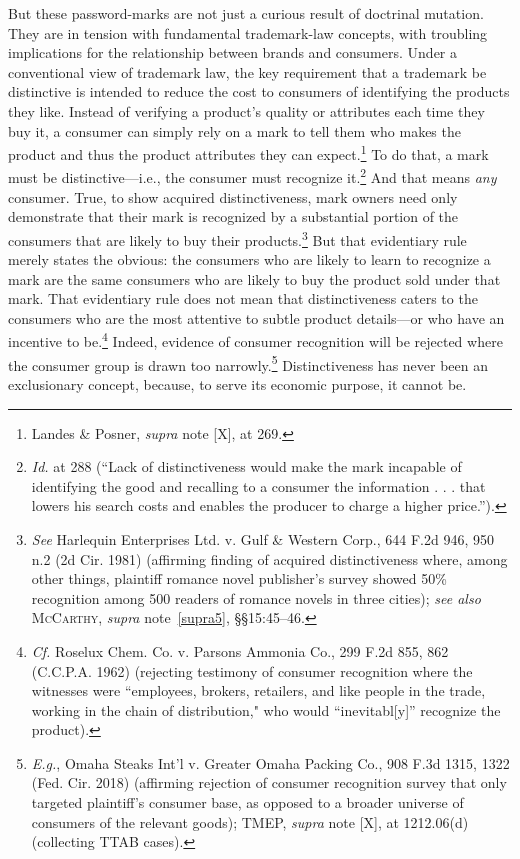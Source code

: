 \documentclass[letterpaper, 11pt, oneside]{article}
\begin{document}
But these password-marks are not just a curious result of doctrinal mutation. They are in tension with fundamental trademark-law concepts, with troubling implications for the relationship between brands and consumers. Under a conventional view of trademark law, the key requirement that a trademark be distinctive is intended to reduce the cost to consumers of identifying the products they like. Instead of verifying a product's quality or attributes each time they buy it, a consumer can simply rely on a mark to tell them who makes the product and thus the product attributes they can expect.\footnote{Landes \& Posner, \textit{supra} note [X], at 269.} To do that, a mark must be distinctive—i.e., the consumer must recognize it.\footnote{\textit{Id.} at 288 (``Lack of distinctiveness would make the mark incapable of identifying the good and recalling to a consumer the information . . . that lowers his search costs and enables the producer to charge a higher price.'').} And that means \textit{any} consumer. True, to show acquired distinctiveness, mark owners need only demonstrate that their mark is recognized by a substantial portion of the consumers that are likely to buy their products.\footnote{\textit{See} Harlequin Enterprises Ltd. v. Gulf \& Western Corp., 644 F.2d 946, 950 n.2 (2d Cir. 1981) (affirming finding of acquired distinctiveness where, among other things, plaintiff romance novel publisher's survey showed 50\% recognition among 500 readers of romance novels in three cities); \textit{see also} \textsc{McCarthy}, \textit{supra} note~\ref{supra5}, \S\S 15:45–46.} But that evidentiary rule merely states the obvious: the consumers who are likely to learn to recognize a mark are the same consumers who are likely to buy the product sold under that mark. That evidentiary rule does not mean that distinctiveness caters to the consumers who are the most attentive to subtle product details—or who have an incentive to be.\footnote{\textit{Cf.} Roselux Chem. Co. v. Parsons Ammonia Co., 299 F.2d 855, 862 (C.C.P.A. 1962) (rejecting testimony of consumer recognition where the witnesses were ``employees, brokers, retailers, and like people in the trade, working in the chain of distribution," who would ``inevitabl[y]'' recognize the product).} Indeed, evidence of consumer recognition will be rejected where the consumer group is drawn too narrowly.\footnote{\textit{E.g.}, Omaha Steaks Int'l v. Greater Omaha Packing Co., 908 F.3d 1315, 1322 (Fed. Cir. 2018) (affirming rejection of consumer recognition survey that only targeted plaintiff's consumer base, as opposed to a broader universe of consumers of the relevant goods); TMEP, \textit{supra} note [X], at 1212.06(d) (collecting TTAB cases).} Distinctiveness has never been an exclusionary concept, because, to serve its economic purpose, it cannot be. 
\end{document}
